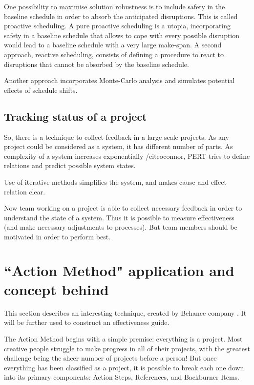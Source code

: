 One possibility to maximise solution robustness is to include safety in the baseline schedule in order to absorb the anticipated disruptions. This is called proactive scheduling. A pure proactive scheduling is a utopia, incorporating safety in a baseline schedule that allows to cope with every possible disruption would lead to a baseline schedule with a very large make-span. A second approach, reactive scheduling, consists of defining a procedure to react to disruptions that cannot be absorbed by the baseline schedule.

Another approach incorporates Monte-Carlo analysis and simulates potential effects of schedule shifts.

\subsection{Tracking status of a project}

So, there is a technique to collect feedback in a large-scale projects. As any project could be considered as a system, it has different number of parts. As complexity of a system increases exponentially /cite{oconnor}, PERT tries to define relations and predict possible system states.

Use of iterative methods simplifies the system, and makes cause-and-effect relation clear.

Now team working on a project is able to collect necessary feedback in order to understand the state of a system. Thus it is possible to measure effectiveness (and make necessary adjustments to processes). But team members should be motivated in order to perform best.

\section{``Action Method" application and concept behind}

This section describes an interesting technique, created by Behance company \cite{belsky}. It will be further used to construct an effectiveness guide.

The Action Method begins with a simple premise: everything is a project. Most creative people struggle to make progress in all of their projects, with the greatest challenge being the sheer number of projects before a person! But once everything has been classified as a project, it is possible to break each one down into its primary components: Action Steps, References, and Backburner Items.


